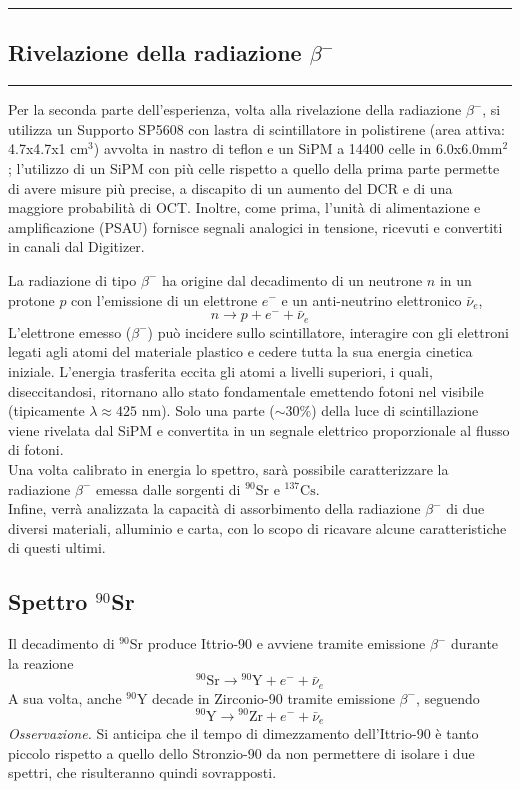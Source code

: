\bigskip
{\color{gray}\hrule}
\begin{center}
\section{Rivelazione della radiazione $\beta^{-}$}
\bigskip
\end{center}
{\color{gray}\hrule}    
Per la seconda parte dell'esperienza, volta alla rivelazione della radiazione $\beta^{-}$, si utilizza un Supporto SP5608 con lastra di scintillatore in polistirene (area attiva: 4.7x4.7x1 cm$^3$) avvolta in nastro di teflon e un SiPM a 14400 celle in 6.0x6.0mm$^2$; l'utilizzo di un SiPM con più celle rispetto a quello della prima parte permette di avere misure più precise, a discapito di un aumento del DCR e di una maggiore probabilità di OCT.
Inoltre, come prima, l’unità di alimentazione e amplificazione (PSAU) fornisce segnali analogici in tensione, ricevuti e convertiti in canali dal Digitizer.

La radiazione di tipo $\beta^{-}$ ha origine dal decadimento di un neutrone $n$ in un protone $p$ con l'emissione di un elettrone $e^-$ e un anti-neutrino elettronico $\bar \nu_e$, $$n \rightarrow p + e^- + \bar \nu_e$$
L’elettrone emesso ($\beta^-$) può incidere sullo scintillatore, interagire con gli elettroni legati agli atomi del materiale plastico e cedere tutta la sua energia cinetica iniziale. L'energia trasferita eccita gli atomi a livelli superiori, i quali, diseccitandosi, ritornano allo stato fondamentale emettendo fotoni nel visibile (tipicamente $\lambda \approx 425$ nm). Solo una parte ($\sim30\%$) della luce di scintillazione viene rivelata dal SiPM e convertita in un segnale elettrico proporzionale al flusso di fotoni. \\ Una volta calibrato in energia lo spettro, sarà possibile caratterizzare la radiazione $\beta^-$ emessa dalle sorgenti di $^{90}\mathrm{Sr}$ e $^{137}\mathrm{Cs}$. \\
Infine, verrà analizzata la capacità di assorbimento della radiazione $\beta^-$ di due diversi materiali, alluminio e carta, con lo scopo di ricavare alcune caratteristiche di questi ultimi. \\

\subsection{Spettro ${}^{90}$Sr}
Il decadimento di ${}^{90}$Sr produce Ittrio-90 e avviene tramite emissione $\beta^-$ durante la reazione
$$^{90}\mathrm{Sr} \rightarrow {}^{90}\mathrm{Y} + e^- + \bar{\nu}_e $$
A sua volta, anche $^{90}\mathrm{Y}$ decade in Zirconio-90 tramite emissione $\beta^-$, seguendo $$^{90}\mathrm{Y} \rightarrow {}^{90}\mathrm{Zr} + e^- + \bar{\nu}_e $$
\textit{Osservazione.} Si anticipa che il tempo di dimezzamento dell'Ittrio-90 è tanto piccolo rispetto a quello dello Stronzio-90 da non permettere di isolare i due spettri, che risulteranno quindi sovrapposti.
